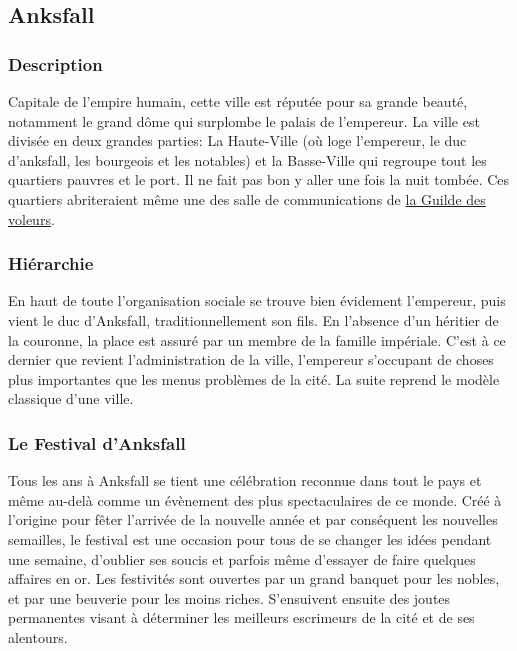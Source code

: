 \subsection{Anksfall}
\subsubsection{Description}
\hypertarget{anksfall}{}Capitale de l'empire humain, cette ville est réputée pour sa grande beauté,
notamment le grand dôme qui surplombe le palais de l'empereur. 
La ville est divisée en deux grandes parties: La Haute-Ville 
(où loge l’empereur, le duc d'anksfall, les bourgeois et les notables)
et la Basse-Ville qui regroupe tout les quartiers pauvres et le port.
Il ne fait pas bon y aller une fois la nuit tombée.
Ces quartiers abriteraient même une des salle de communications de \hyperlink {laguildedesvoleurs}{la Guilde des voleurs}.
\subsubsection{Hiérarchie}
En haut de toute l'organisation sociale se trouve bien évidement l’empereur, puis vient le duc d’Anksfall, traditionnellement son fils. En l’absence d’un héritier de la couronne, la place est assuré par un membre de la famille impériale. C’est à ce dernier que revient l’administration de la ville, l’empereur s’occupant de choses plus importantes que les menus problèmes de la cité. La suite reprend le modèle classique d’une ville. 
\subsubsection{Le Festival d'Anksfall}
Tous les ans à Anksfall se tient une célébration reconnue dans tout le pays et même au-delà comme un évènement des plus spectaculaires de ce monde. Créé à l'origine pour fêter l'arrivée de la nouvelle année et par conséquent les nouvelles semailles, le festival est une occasion pour tous de se changer les idées pendant une semaine, d'oublier ses soucis et parfois même d'essayer de faire quelques affaires en or. Les festivités sont ouvertes par un grand banquet pour les nobles, et par une beuverie pour les moins riches. S'ensuivent ensuite des joutes permanentes visant à déterminer les meilleurs escrimeurs de la cité et de ses alentours.
